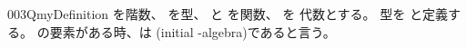 \documentclass[index]{subfiles}
\begin{document}
\begin{myBlock}{003Q}{myDefinition}
  を階数、
  を型、
  と
  を関数、
  を
  代数とする。
  型を
  と定義する。
  の要素がある時、は
  (initial -algebra)であると言う。
\end{myBlock}
\end{document}
